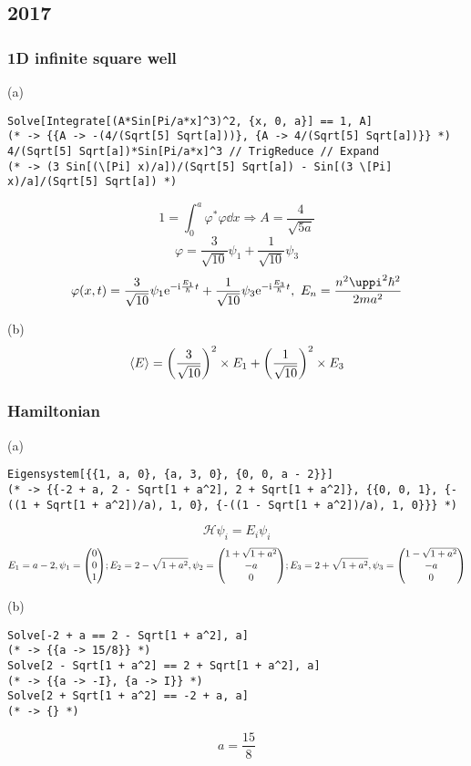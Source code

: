 \subsection{2017}

\subsubsection{1D infinite square well}

(a)
\begin{verbatim}
Solve[Integrate[(A*Sin[Pi/a*x]^3)^2, {x, 0, a}] == 1, A]
(* -> {{A -> -(4/(Sqrt[5] Sqrt[a]))}, {A -> 4/(Sqrt[5] Sqrt[a])}} *)
4/(Sqrt[5] Sqrt[a])*Sin[Pi/a*x]^3 // TrigReduce // Expand
(* -> (3 Sin[(\[Pi] x)/a])/(Sqrt[5] Sqrt[a]) - Sin[(3 \[Pi] x)/a]/(Sqrt[5] Sqrt[a]) *)
\end{verbatim}
\[
1 = \int_0^a \varphi^* \varphi \dd{x} \Rightarrow A = \frac{4}{\sqrt{5 a}}
\] \[
\varphi = \frac{3}{\sqrt{10}} \psi_1 + \frac{1}{\sqrt{10}} \psi_3
\] \[
\varphi(x, t) = \frac{3}{\sqrt{10}} \psi_1 \rme^{- \rmi \frac{E_1}{\hbar} t} + \frac{1}{\sqrt{10}} \psi_3 \rme^{- \rmi \frac{E_3}{\hbar} t},\ E_n = \frac{n^2 \uppi^2 \hbar^2}{2 m a^2}
\]

(b)
\[
\expval{E} = \qty(\frac{3}{\sqrt{10}})^2 \times E_1 + \qty(\frac{1}{\sqrt{10}})^2 \times E_3
\]

\subsubsection{Hamiltonian}

(a)
\begin{verbatim}
Eigensystem[{{1, a, 0}, {a, 3, 0}, {0, 0, a - 2}}]
(* -> {{-2 + a, 2 - Sqrt[1 + a^2], 2 + Sqrt[1 + a^2]}, {{0, 0, 1}, {-((1 + Sqrt[1 + a^2])/a), 1, 0}, {-((1 - Sqrt[1 + a^2])/a), 1, 0}}} *)
\end{verbatim}
\[
\mathcal{H} \psi_i = E_i \psi_i
\] \[
E_1 = a - 2, \psi_1 = \mqty(0 \\ 0 \\ 1); E_2 = 2 - \sqrt{1 + a^2}, \psi_2 = \mqty(1 + \sqrt{1 + a^2} \\ - a \\ 0); E_3 = 2 + \sqrt{1 + a^2}, \psi_3 = \mqty(1 - \sqrt{1 + a^2} \\ - a \\ 0)
\]

(b)
\begin{verbatim}
Solve[-2 + a == 2 - Sqrt[1 + a^2], a]
(* -> {{a -> 15/8}} *)
Solve[2 - Sqrt[1 + a^2] == 2 + Sqrt[1 + a^2], a]
(* -> {{a -> -I}, {a -> I}} *)
Solve[2 + Sqrt[1 + a^2] == -2 + a, a]
(* -> {} *)
\end{verbatim}
\[
a = \frac{15}{8}
\]

